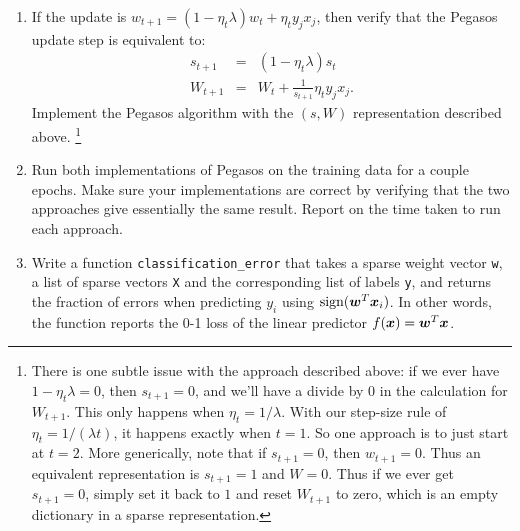 \documentclass{article}
\newcommand{\code}[1]{\texttt{#1}}
\theoremstyle{plain}
\theoremstyle{definition}
\begin{document}
\begin{enumerate}
  \setcounter{enumi}{\value{saveenum}}
\item 
If the update is $w_{t+1}=(1-\eta_{t}\lambda)w_{t}+\eta_{t}y_{j}x_{j}$,
then verify that the Pegasos update step is equivalent to:
\begin{eqnarray*}
s_{t+1} & = & \left(1-\eta_{t}\lambda\right)s_{t}\\
W_{t+1} & = & W_{t}+\frac{1}{s_{t+1}}\eta_{t}y_{j}x_{j}.
\end{eqnarray*}
Implement the Pegasos algorithm with the $(s,W)$ representation
described above. \footnote{There is one subtle issue with the approach described above: if we
ever have $1-\eta_{t}\lambda=0$, then $s_{t+1}=0$, and we'll have
a divide by $0$ in the calculation for $W_{t+1}$. This only happens
when $\eta_{t}=1/\lambda$. With our step-size rule of $\eta_{t}=1/\left(\lambda t\right)$,
it happens exactly when $t=1$. So one approach is to just start at
$t=2$. More generically, note that if $s_{t+1}=0$, then $w_{t+1}=0$.
Thus an equivalent representation is $s_{t+1}=1$ and $W=0$. Thus
if we ever get $s_{t+1}=0$, simply set it back to $1$ and reset
$W_{t+1}$ to zero, which is an empty dictionary in a sparse representation.}



\item Run both implementations of Pegasos on the training data for a couple
epochs. Make sure your implementations are correct by verifying that the two
approaches give essentially the same result. Report on the time taken
to run each approach.\\


\item Write a function \code{classification\_error} that takes a sparse weight vector \code{w}, a list of sparse vectors \code{X} and the corresponding list of labels \code{y}, and returns the fraction of errors when predicting $y_i$
using $\textrm{sign}(\boldsymbol{w}^{T}\boldsymbol{x}_i)$. In other words, the function reports the 0-1
loss of the linear predictor $f(\boldsymbol{x}) = \boldsymbol{w}^{T}\boldsymbol{x}$.


\end{enumerate}
\end{document}
